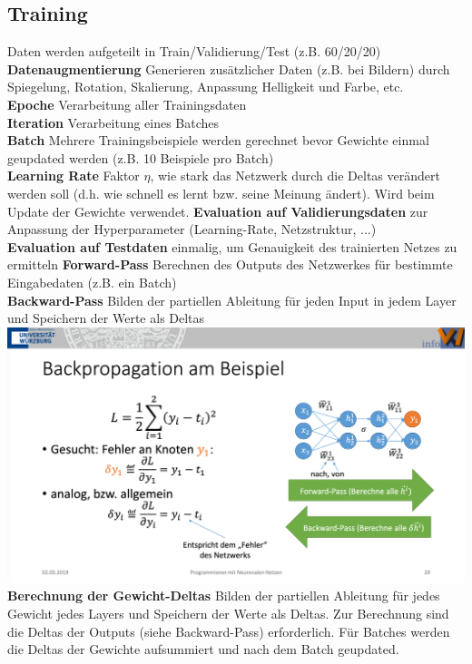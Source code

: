 \documentclass[12pt]{article}
\begin{document}
	\subsection{Training}
	Daten werden aufgeteilt in Train/Validierung/Test (z.B. 60/20/20)\\
	\textbf{Datenaugmentierung} Generieren zusätzlicher Daten (z.B. bei Bildern) durch Spiegelung, Rotation, Skalierung, Anpassung Helligkeit und Farbe, etc.\\
	\textbf{Epoche} Verarbeitung aller Trainingsdaten\\
	\textbf{Iteration} Verarbeitung eines Batches\\
	\textbf{Batch} Mehrere Trainingsbeispiele werden gerechnet bevor Gewichte einmal geupdated werden (z.B. 10 Beispiele pro Batch)\\
	\textbf{Learning Rate} Faktor $\eta$, wie stark das Netzwerk durch die Deltas verändert werden soll (d.h. wie schnell es lernt bzw. seine Meinung ändert). Wird beim Update der Gewichte verwendet.
	\textbf{Evaluation auf Validierungsdaten} zur Anpassung der Hyperparameter (Learning-Rate, Netzstruktur, ...)\\
	\textbf{Evaluation auf Testdaten} einmalig, um Genauigkeit des trainierten Netzes zu ermitteln
	\textbf{Forward-Pass} Berechnen des Outputs des Netzwerkes für bestimmte Eingabedaten (z.B. ein Batch)\\
	\textbf{Backward-Pass} Bilden der partiellen Ableitung für jeden Input in jedem Layer und Speichern der Werte als Deltas\\
	\includegraphics[width=\linewidth]{figures/backpropagation.png}\\
	\textbf{Berechnung der Gewicht-Deltas} Bilden der partiellen Ableitung für jedes Gewicht jedes Layers und Speichern der Werte als Deltas. Zur Berechnung sind die Deltas der Outputs (siehe Backward-Pass) erforderlich. Für Batches werden die Deltas der Gewichte aufsummiert und nach dem Batch geupdated.\\
\end{document}
